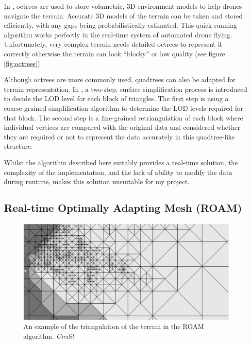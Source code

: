 \documentclass[notitlepage,12pt]{article}
\begin{document}
In \cite{octrees}, octrees are used to store volumetric, 3D environment models to help drones navigate the terrain. Accurate 3D models of the terrain can be taken and stored efficiently, with any gaps being probabilistically estimated. This quick-running algorithm works perfectly in the real-time system of automated drone flying. Unfortunately, very complex terrain needs detailed octrees to represent it correctly otherwise the terrain can look ``blocky'' or low quality (see figure \ref{fig:octrees}).

Although octrees are more commonly used, quadtrees can also be adapted for terrain representation. In \cite{quadtrees}, a two-step, surface simplification process is introduced to decide the LOD level for each block of triangles. The first step is using a coarse-grained simplification algorithm to determine the LOD levels required for that block. The second step is a fine-grained retriangulation of each block where individual vertices are compared with the original data and considered whether they are required or not to represent the data accurately in this quadtree-like structure.

Whilst the algorithm described here suitably provides a real-time solution, the complexity of the implementation, and the lack of ability to modify the data during runtime, makes this solution unsuitable for my project.

\subsection{Real-time Optimally Adapting Mesh (ROAM)}

\begin{figure}[ht]
  \centering
  \includegraphics[width=1.0\textwidth]{roam.png}
  \caption{An example of the triangulation of the terrain in the ROAM algorithm. \textit{Credit \cite{roam}}}
  \label{fig:roam}
\end{figure}
\end{document}
